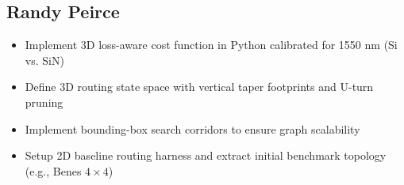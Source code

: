 \documentclass{article}
\begin{document}
 \subsection{Randy Peirce}
    \begin{itemize}
        \item Implement 3D loss-aware cost function in Python calibrated for 1550 nm (Si vs. SiN)
        \item Define 3D routing state space with vertical taper footprints and U-turn pruning
        \item Implement bounding-box search corridors to ensure graph scalability
        \item Setup 2D baseline routing harness and extract initial benchmark topology (e.g., Benes $4\times4$)
    \end{itemize}
\end{document}
